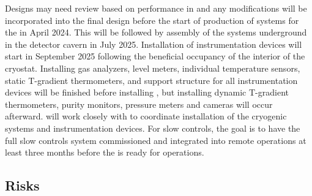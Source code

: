 Designs may need review based on performance in  and any modifications will be incorporated into the final design before the start of production of  systems for the  in April 2024. This will be followed by assembly of the systems underground in the detector cavern in July 2025. Installation of instrumentation devices will start in September 2025 following the beneficial occupancy of the interior of the cryostat. Installing gas analyzers, level meters, individual temperature sensors, static T-gradient thermometers, and support structure for all instrumentation devices will be finished before installing , but installing dynamic T-gradient thermometers, purity monitors, pressure meters and cameras will occur afterward.  will work closely with  to coordinate installation of the cryogenic systems and instrumentation devices. For slow controls, the goal is to have the full slow controls system commissioned and integrated into remote operations at least three months before the  is ready for operations.  




\subsection{Risks}


